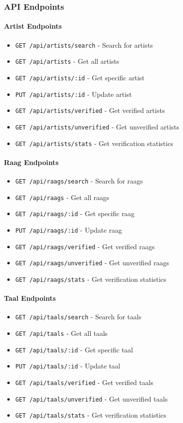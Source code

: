 \documentclass[12pt,a4paper]{article}
\begin{document}
\subsubsection{API Endpoints}

\paragraph{Artist Endpoints}
\begin{itemize}
    \item \texttt{GET /api/artists/search} - Search for artists
    \item \texttt{GET /api/artists} - Get all artists
    \item \texttt{GET /api/artists/:id} - Get specific artist
    \item \texttt{PUT /api/artists/:id} - Update artist
    \item \texttt{GET /api/artists/verified} - Get verified artists
    \item \texttt{GET /api/artists/unverified} - Get unverified artists
    \item \texttt{GET /api/artists/stats} - Get verification statistics
\end{itemize}

\paragraph{Raag Endpoints}
\begin{itemize}
    \item \texttt{GET /api/raags/search} - Search for raags
    \item \texttt{GET /api/raags} - Get all raags
    \item \texttt{GET /api/raags/:id} - Get specific raag
    \item \texttt{PUT /api/raags/:id} - Update raag
    \item \texttt{GET /api/raags/verified} - Get verified raags
    \item \texttt{GET /api/raags/unverified} - Get unverified raags
    \item \texttt{GET /api/raags/stats} - Get verification statistics
\end{itemize}

\paragraph{Taal Endpoints}
\begin{itemize}
    \item \texttt{GET /api/taals/search} - Search for taals
    \item \texttt{GET /api/taals} - Get all taals
    \item \texttt{GET /api/taals/:id} - Get specific taal
    \item \texttt{PUT /api/taals/:id} - Update taal
    \item \texttt{GET /api/taals/verified} - Get verified taals
    \item \texttt{GET /api/taals/unverified} - Get unverified taals
    \item \texttt{GET /api/taals/stats} - Get verification statistics
\end{itemize}
\end{document}
